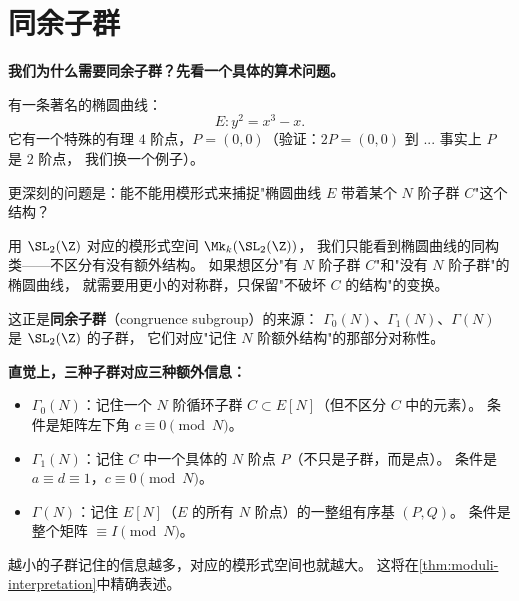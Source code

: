 \section{同余子群}
\label{sec:congruence-subgroups}

\textbf{我们为什么需要同余子群？先看一个具体的算术问题。}

有一条著名的椭圆曲线：
\[
  E\colon y^2 = x^3 - x.
\]
它有一个特殊的有理 $4$ 阶点，$P = (0, 0)$（验证：$2P = (0,0)$ 到 ... 事实上 $P$ 是 $2$ 阶点，
我们换一个例子）。

更深刻的问题是：能不能用模形式来捕捉"椭圆曲线 $E$ 带着某个 $N$ 阶子群 $C$"这个结构？

用 $\SL_2(\Z)$ 对应的模形式空间 $\Mk_k(\SL_2(\Z))$，
我们只能看到椭圆曲线的同构类——不区分有没有额外结构。
如果想区分"有 $N$ 阶子群 $C$"和"没有 $N$ 阶子群"的椭圆曲线，
就需要用更小的对称群，只保留"不破坏 $C$ 的结构"的变换。

这正是\textbf{同余子群}（congruence subgroup）的来源：
$\Gamma_0(N)$、$\Gamma_1(N)$、$\Gamma(N)$ 是 $\SL_2(\Z)$ 的子群，
它们对应"记住 $N$ 阶额外结构"的那部分对称性。

\textbf{直觉上，三种子群对应三种额外信息：}
\begin{itemize}
  \item $\Gamma_0(N)$：记住一个 $N$ 阶循环子群 $C \subset E[N]$（但不区分 $C$ 中的元素）。
    条件是矩阵左下角 $c \equiv 0 \pmod N$。
  \item $\Gamma_1(N)$：记住 $C$ 中一个具体的 $N$ 阶点 $P$（不只是子群，而是点）。
    条件是 $a \equiv d \equiv 1$，$c \equiv 0 \pmod N$。
  \item $\Gamma(N)$：记住 $E[N]$（$E$ 的所有 $N$ 阶点）的一整组有序基 $(P, Q)$。
    条件是整个矩阵 $\equiv I \pmod N$。
\end{itemize}
越小的子群记住的信息越多，对应的模形式空间也就越大。
这将在\cref{thm:moduli-interpretation}中精确表述。

